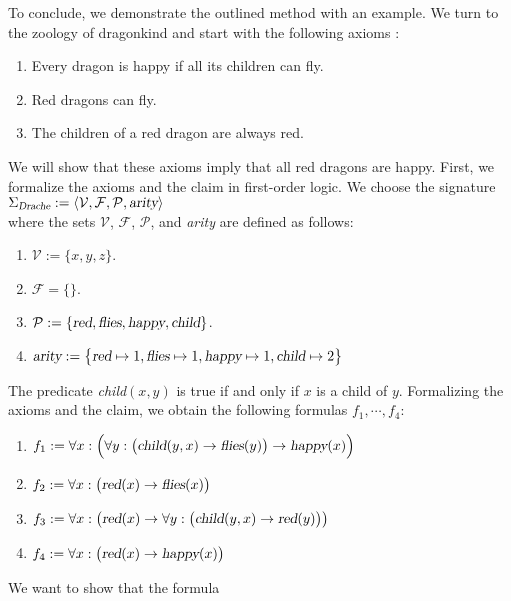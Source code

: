\exampleEng
To conclude, we demonstrate the outlined method with an example.  We turn to the zoology of dragonkind and
start with the following axioms \cite{schoening:2008}:
\begin{enumerate}
\item Every dragon is happy if all its children can fly.
\item Red dragons can fly.
\item The children of a red dragon are always red.
\end{enumerate}
We will show that these axioms imply that all red dragons are happy.
First, we formalize the axioms and the claim in first-order logic.
We choose the signature \\[0.2cm]
\hspace*{1.3cm}
$\Sigma_\textsl{Drache} := \langle \mathcal{V}, \mathcal{F}, \mathcal{P}, \textsl{arity} \rangle$ 
\\[0.2cm]
where the sets $\mathcal{V}$, $\mathcal{F}$, $\mathcal{P}$, and \textsl{arity} are defined as follows:
\begin{enumerate}
\item $\mathcal{V} := \{x,y,z\}$.
\item $\mathcal{F} = \{\}$.
\item $\mathcal{P} := \{ \textsl{red}, \textsl{flies}, \textsl{happy}, \textsl{child} \}$.
\item $\textsl{arity} := \bigl\{ \textsl{red} \mapsto 1, \textsl{flies} \mapsto 1,
         \textsl{happy} \mapsto 1, \textsl{child} \mapsto 2\bigr\}$
\end{enumerate}
The predicate \textsl{child}$(x,y)$ is true if and only if $x$ is a child of $y$.
Formalizing the axioms and the claim, we obtain the following
formulas $f_1, \cdots, f_4$:
\begin{enumerate}
\item $f_1 := \forall x: \Bigl(\forall y: \big(\textsl{child}(y,x) \rightarrow \textsl{flies}(y)\big) \rightarrow \textsl{happy}(x)\Bigr)$
\item $f_2 := \forall x: \bigl(\textsl{red}(x) \rightarrow \textsl{flies}(x)\bigr)$
\item $f_3 := \forall x: \bigl(\textsl{red}(x) \rightarrow \forall y:\bigl( \textsl{child}(y,x) \rightarrow \textsl{red}(y)\bigr)\bigr)$
\item $f_4 := \forall x: \bigl(\textsl{red}(x) \rightarrow \textsl{happy}(x)\bigr)$
\end{enumerate}
We want to show that the formula 
\\[0.2cm]

